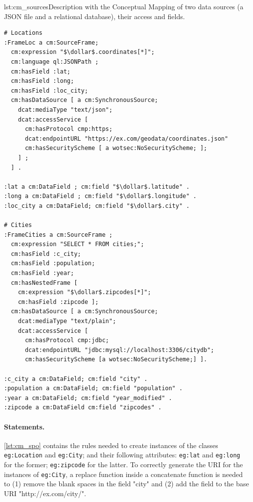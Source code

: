 \begin{captionedlisting}{lst:cm_sources}{Description with the Conceptual Mapping of two data sources (a JSON file and a relational database), their access and fields.}
\centering
{\begin{lstlisting}[language=concm,firstnumber=1]
# Locations
:FrameLoc a cm:SourceFrame;
  cm:expression "$\dollar$.coordinates[*]";
  cm:language ql:JSONPath ;
  cm:hasField :lat;
  cm:hasField :long;
  cm:hasField :loc_city;
  cm:hasDataSource [ a cm:SynchronousSource;
    dcat:mediaType "text/json";
    dcat:accessService [
      cm:hasProtocol cmp:https;
      dcat:endpointURL "https://ex.com/geodata/coordinates.json" 
      cm:hasSecurityScheme [ a wotsec:NoSecurityScheme; ];
    ] ;
  ] .

:lat a cm:DataField ; cm:field "$\dollar$.latitude" .
:long a cm:DataField ; cm:field "$\dollar$.longitude" .
:loc_city a cm:DataField; cm:field "$\dollar$.city" .

# Cities
:FrameCities a cm:SourceFrame ;
  cm:expression "SELECT * FROM cities;";
  cm:hasField :c_city;
  cm:hasField :population;
  cm:hasField :year;
  cm:hasNestedFrame [
    cm:expression "$\dollar$.zipcodes[*]";
    cm:hasField :zipcode ];
  cm:hasDataSource [ a cm:SynchronousSource;
    dcat:mediaType "text/plain";
    dcat:accessService [
      cm:hasProtocol cmp:jdbc;
      dcat:endpointURL "jdbc:mysql://localhost:3306/citydb";
      cm:hasSecurityScheme [a wotsec:NoSecurityScheme;] ].

:c_city a cm:DataField; cm:field "city" .
:population a cm:DataField; cm:field "population" .
:year a cm:DataField; cm:field "year_modified" .
:zipcode a cm:DataField cm:field "zipcodes" .
\end{lstlisting}}
\end{captionedlisting}


\noindent\paragraph{\textbf{Statements.}} \cref{lst:cm_spo} contains the rules needed to create instances of the classes \texttt{eg:Location} and \texttt{eg:City}; and their following attributes: \texttt{eg:lat} and \texttt{eg:long} for the former; \texttt{eg:zipcode} for the latter. To correctly generate the URI for the instances of \texttt{eg:City}, a replace function inside a concatenate function is needed to (1) remove the blank spaces in the field "city" and (2) add the field to the base URI "http://ex.com/city/".

